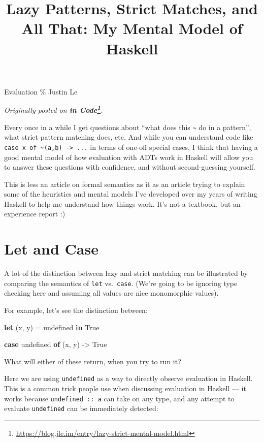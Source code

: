 \documentclass[]{article}
\title{Lazy Patterns, Strict Matches, and All That: My Mental Model of Haskell}
\newenvironment{Shaded}{}{}
\newcommand{\DataTypeTok}[1]{\textcolor[rgb]{0.56,0.13,0.00}{#1}}
\newcommand{\FunctionTok}[1]{\textcolor[rgb]{0.02,0.16,0.49}{#1}}
\newcommand{\KeywordTok}[1]{\textcolor[rgb]{0.00,0.44,0.13}{\textbf{#1}}}
\newcommand{\NormalTok}[1]{#1}
\newcommand{\OtherTok}[1]{\textcolor[rgb]{0.00,0.44,0.13}{#1}}
\renewcommand{\href}[2]{#2\footnote{\url{#1}}}
\begin{document}
\maketitle

Evaluation \% Justin Le

\emph{Originally posted on
\textbf{\href{https://blog.jle.im/entry/lazy-strict-mental-model.html}{in
Code}}.}

Every once in a while I get questions about ``what does this
\texttt{\textasciitilde{}} do in a pattern'', what strict pattern matching does,
etc. And while you can understand code like
\texttt{case\ x\ of\ \textasciitilde{}(a,b)\ -\textgreater{}\ ...} in terms of
one-off special cases, I think that having a good mental model of how evaluation
with ADTs work in Haskell will allow you to answer these questions with
confidence, and without second-guessing yourself.

This is less an article on formal semantics as it as an article trying to
explain some of the heuristics and mental models I've developed over my years of
writing Haskell to help me understand how things work. It's not a textbook, but
an experience report :)

\hypertarget{let-and-case}{%
\section{Let and Case}\label{let-and-case}}

A lot of the distinction between lazy and strict matching can be illustrated by
comparing the semantics of \texttt{let} vs.~\texttt{case}. (We're going to be
ignoring type checking here and assuming all values are nice monomorphic
values).

For example, let's see the distinction between:

\begin{Shaded}
\begin{Highlighting}[]
\KeywordTok{let}\NormalTok{ (x, y) }\OtherTok{=} \FunctionTok{undefined}
\KeywordTok{in}  \DataTypeTok{True}

\KeywordTok{case} \FunctionTok{undefined} \KeywordTok{of}
\NormalTok{    (x, y) }\OtherTok{{-}>} \DataTypeTok{True}
\end{Highlighting}
\end{Shaded}

What will either of these return, when you try to run it?

Here we are using \texttt{undefined} as a way to directly observe evaluation in
Haskell. This is a common trick people use when discussing evaluation in Haskell
--- it works because \texttt{undefined\ ::\ a} can take on any type, and any
attempt to evaluate \texttt{undefined} can be immediately detected:
\end{document}
